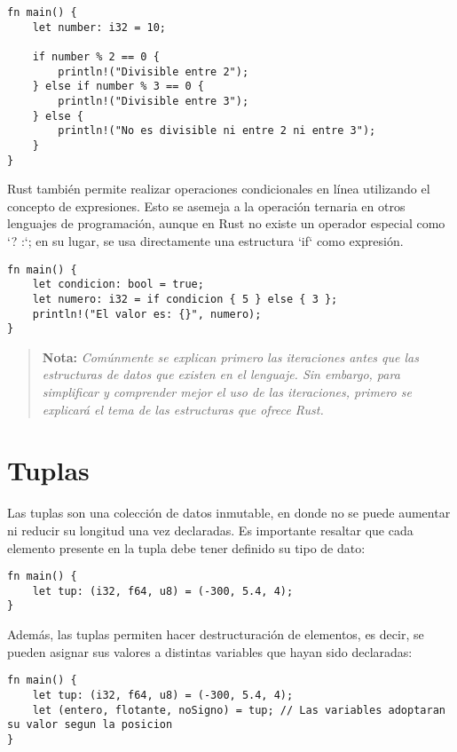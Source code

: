 \documentclass[12pt]{article}
\begin{document}
\begin{lstlisting}[style=ruststyle]
fn main() {
	let number: i32 = 10;

	if number % 2 == 0 {
		println!("Divisible entre 2");
	} else if number % 3 == 0 {
		println!("Divisible entre 3");
	} else {
		println!("No es divisible ni entre 2 ni entre 3");
	}
}
\end{lstlisting}


Rust también permite realizar operaciones condicionales en línea utilizando el concepto de expresiones. Esto se asemeja a la operación ternaria en otros lenguajes de programación, aunque en Rust no existe un operador especial como `? :`; en su lugar, se usa directamente una estructura `if` como expresión.
\newline\newline\newline
\begin{lstlisting}[style=ruststyle]
fn main() {
	let condicion: bool = true;
	let numero: i32 = if condicion { 5 } else { 3 };
	println!("El valor es: {}", numero);
}
\end{lstlisting}


\begin{quote}
	\textbf{Nota:} \textit{Comúnmente se explican primero las iteraciones antes que las estructuras de datos que existen en el lenguaje. Sin embargo, para simplificar y comprender mejor el uso de las iteraciones, primero se explicará el tema de las estructuras que ofrece Rust.}
\end{quote}

\section{Tuplas}
Las tuplas son una colección de datos inmutable, en donde no se puede aumentar ni reducir su longitud una vez declaradas. Es importante resaltar que cada elemento presente en la tupla debe tener definido su tipo de dato:

\begin{lstlisting}[style=ruststyle]
fn main() {
	let tup: (i32, f64, u8) = (-300, 5.4, 4);
}
\end{lstlisting}

Además, las tuplas permiten hacer destructuración de elementos, es decir, se pueden asignar sus valores a distintas variables que hayan sido declaradas:\newpage
\begin{lstlisting}[style=ruststyle]
fn main() {
	let tup: (i32, f64, u8) = (-300, 5.4, 4);
	let (entero, flotante, noSigno) = tup; // Las variables adoptaran su valor segun la posicion
}
\end{lstlisting}
\end{document}
